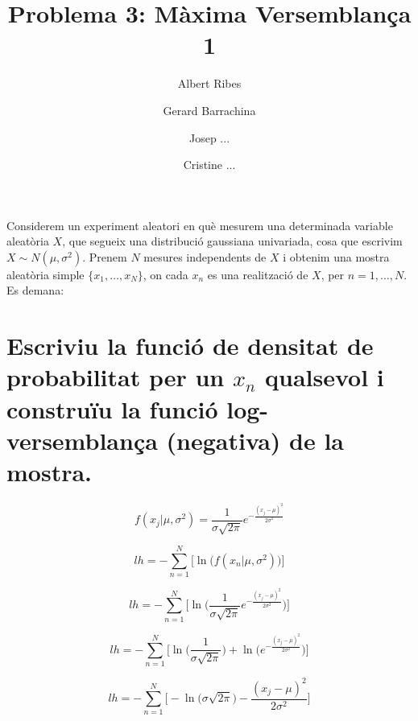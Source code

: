 \documentclass[a4paper,10pt]{article}
\title{Problema 3: Màxima Versemblança 1}
\author{
Albert Ribes
\and
Gerard Barrachina
\and
Josep ...
\and
Cristine ...
}
\begin{document}
\maketitle

% 


Considerem un experiment aleatori en què mesurem una determinada variable aleatòria $X$,
que segueix
una distribució gaussiana univariada, cosa que escrivim $X \sim N(\mu, \sigma^2)$. Prenem $N$
mesures independents de $X$ i obtenim una mostra aleatòria simple $\{x_1, \dots, x_N\}$,
on cada $x_n$ es una realització de $X$, per $n = 1,\dots,N$. Es demana:

\section{Escriviu la funció de densitat de probabilitat per un $x_n$ qualsevol i construïu la funció log-versemblança (negativa) de la mostra.}

\begin{equation*}
f(x_j | \mu, \sigma^2) = \frac{1}{\sigma\sqrt{2\pi}}e^{-\frac{(x_j - \mu)^2}{2\sigma^2}}
\end{equation*}

\begin{equation*}
lh = - \sum_{n = 1}^{N} \Big[ \ln{\big( f(x_n | \mu, \sigma^2)\big)} \Big]
\end{equation*}

\begin{equation*}
lh = - \sum_{n = 1}^{N} \Big[ \ln{\Big(  \frac{1}{\sigma\sqrt{2\pi}}e^{-\frac{(x_j - \mu)^2}{2\sigma^2}} \Big)} \Big]
\end{equation*}

\begin{equation*}
lh = - \sum_{n = 1}^{N} \Big[ \ln{\Big(  \frac{1}{\sigma\sqrt{2\pi}}\Big)} + \ln{\Big(e^{-\frac{(x_j - \mu)^2}{2\sigma^2}} \Big)} \Big]
\end{equation*}

\begin{equation*}
lh = - \sum_{n = 1}^{N} \Big[ -\ln{\big(  \sigma\sqrt{2\pi} \big)} - \frac{(x_j - \mu)^2}{2\sigma^2} \Big]
\end{equation*}
\end{document}

